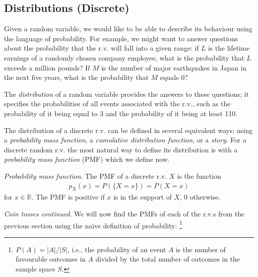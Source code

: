 \subsection{Distributions (Discrete)}

Given a random variable, 
we would like to be able to describe its
behaviour using the language of probability. 
For example, 
we might want to answer questions 
about the probability that the r.v. will fall into a given range: 
if \(L\) is the lifetime earnings of a randomly chosen company employee, 
what is the probability that \(L\) exceeds a million pounds? 
If \(M\) is the number of major earthquakes in Japan in the next five years, 
what is the probability that \(M\) equals 0? 

The \emph{distribution} of a random variable provides the answers to these questions; 
it specifies the probabilities of all events associated with the r.v., 
such as the probability of it being equal to 3 and the probability of it being at least 110.

The distribution of a discrete r.v. can be defined in several equivalent ways: 
using a \emph{probability mass function},
a \emph{cumulative distribution function},
or a \emph{story}.
For a discrete random r.v. the most natural way to define its distribution
is with a \emph{probability mass function} (PMF) which we define now.

\emph{Probability mass function}. 
The PMF of a discrete r.v. \(X\) is the function
\begin{align}
p_{X}(x)=P\left(\{X=x\}\right)=P(X=x)
\end{align}
for \(x \in \mathbb{R}\). 
The PMF is positive if \(x\) is in the support of \(X\), 0 otherwise.

\emph{Coin tosses continued}. 
We will now find the PMFs of each of the r.v.s from 
the previous section using the naïve definition of probability:%
\footnote{%
\(P(A) = |A|/|S|\), i.e., 
the probability of an event \(A\) is the number of 
favourable outcomes in \(A\) divided by
the total number of outcomes in the sample space \(S\).}

